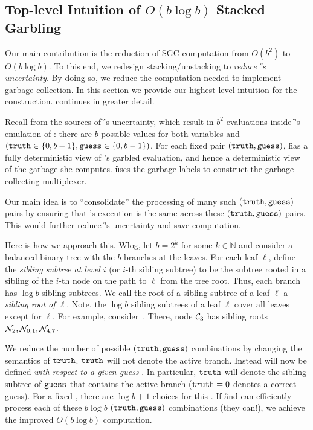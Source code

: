 
\subsection{Top-level Intuition of $O(b \log b)$ Stacked Garbling}
\label{sec:intuition}

Our main contribution is the reduction of SGC computation from
$O(b^2)$ to $O(b \log b)$.  To this end, we redesign
stacking/unstacking to \emph{reduce \G's
uncertainty}.
%
By doing so, we reduce the computation needed to implement garbage
collection.
%
In this section we provide our highest-level intuition for the
construction.  continues in greater detail.

Recall from  the  sources of \G's
uncertainty, which result in $b^2$ evaluations inside \G's emulation
of \E: there are $b$ possible values for both variables \truth and \guess
$(\mathtt{truth} \in\{0,b-1\}, \mathtt{guess}\in\{0,b-1\})$.
%
For each fixed pair  $(\mathtt{truth},\mathtt{guess})$, \G has a fully
deterministic view of \E's garbled evaluation, and hence a deterministic view of
the garbage she computes.
\G uses the garbage labels to construct the garbage collecting multiplexer.

Our main idea is to ``consolidate'' the processing of many
such $(\mathtt{truth},\mathtt{guess})$ pairs by ensuring that \E's execution is the
same across these $(\mathtt{truth},\mathtt{guess})$ pairs.  This would further reduce \G's
uncertainty and save computation.

Here is how we approach this.
Wlog, let $b = 2^k$ for some $k \in \mathbb{N}$ and consider a balanced
binary tree with the $b$ branches at the leaves.
For each leaf $\ell$, define the {\em sibling subtree at level $i$} (or
$i$-th  sibling subtree) to be the subtree rooted in a sibling of the
$i$-th node on the path to $\ell$ from the tree root.  Thus, each branch
has $\log b$ sibling subtrees.
We call the root of a
sibling subtree of a leaf $\ell$ a {\em sibling root of $\ell$}.
Note, the $\log b$ sibling subtrees of a leaf $\ell$ 
cover all leaves except for $\ell$.
For example, consider~.
There, node $\mathcal C_3$ has sibling roots $\mathtt{\cal N}_2, \mathtt{\cal N}_{0,1},
\mathtt{\cal N}_{4,7}$.

We reduce the number of possible $(\mathtt{truth}, \mathtt{guess})$ combinations by
changing the semantics of $\mathtt{truth}$.
$\mathtt{truth}$ will not denote the active branch. Instead \truth will
now be defined \emph{with respect to a given guess} \guess.
In particular, $\mathtt{truth}$ will denote the sibling subtree of $\mathtt{guess}$
that contains the active branch ($\mathtt{truth} = 0$ denotes a correct
guess).
For a fixed \guess, there are $\log b + 1$
choices for this \truth.  If \G and \E can efficiently process each
of these $b\log b$  $(\mathtt{truth},\mathtt{guess})$ combinations  (they
can!), we achieve the improved $O(b\log b)$ computation.
